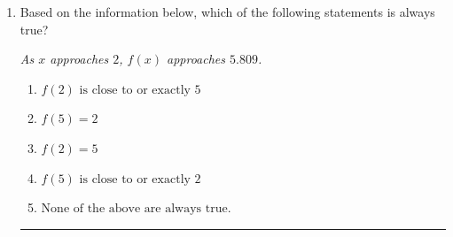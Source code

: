 \documentclass[14pt]{extbook}
\newcommand{\litem}[1]{\item#1\hspace*{-1cm}\rule{\textwidth}{0.4pt}}
\begin{document}
\begin{enumerate}
{\begin{enumerate}[label=\Alph*.]
\end{enumerate} }
\litem{
Based on the information below, which of the following statements is always true?
\begin{center}
    \textit{ As $x$ approaches $2$, $f(x)$ approaches $5.809$. }
\end{center}
\begin{enumerate}[label=\Alph*.]
\item \( f(2) \text{ is close to or exactly } 5 \)
\item \( f(5) = 2 \)
\item \( f(2) = 5 \)
\item \( f(5) \text{ is close to or exactly } 2 \)
\item \( \text{None of the above are always true.} \)

\end{enumerate} }
\end{enumerate}
\end{document}
